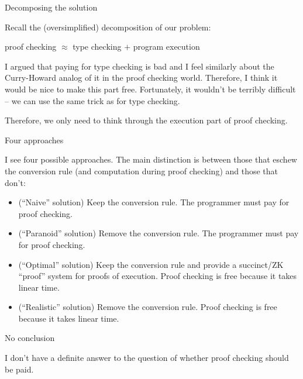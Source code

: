 \documentclass{beamer}
\begin{document}
\begin{frame}{Decomposing the solution}

Recall the (oversimplified) decomposition of our problem:

\vspace{1em}

\begin{center}
  proof checking $\approx$ type checking $+$ program execution
\end{center}

\vspace{1em}

I argued that paying for type checking is bad and I feel similarly about the Curry-Howard analog of it in the proof checking world. Therefore, I think it would be nice to make this part free. Fortunately, it wouldn't be terribly difficult -- we can use the same trick as for type checking.

\vspace{1em}

Therefore, we only need to think through the execution part of proof checking.

\end{frame}

\begin{frame}{Four approaches}

I see four possible approaches. The main distinction is between those that eschew the conversion rule (and computation during proof checking) and those that don't:

\begin{itemize}
  \item (``Naive'' solution) Keep the conversion rule. The programmer must pay for proof checking.
  \item (``Paranoid'' solution) Remove the conversion rule. The programmer must pay for proof checking.
  \item (``Optimal'' solution) Keep the conversion rule and provide a succinct/ZK ``proof'' system for proofs of execution. Proof checking is free because it takes linear time.
  \item (``Realistic'' solution) Remove the conversion rule. Proof checking is free because it takes linear time.
\end{itemize}

\end{frame}

\begin{frame}{No conclusion}

I don't have a definite answer to the question of whether proof checking should be paid.

\end{frame}
\end{document}
